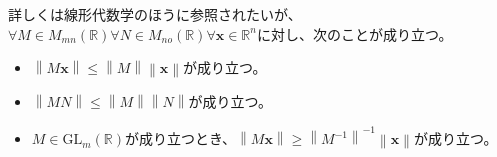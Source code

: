 \documentclass[dvipdfmx]{jsarticle}
\begin{document}
\begin{thm}\label{4.2.6.7}
詳しくは線形代数学のほうに参照されたいが、$\forall M \in M_{mn}\left( \mathbb{R} \right)\forall N \in M_{no}\left( \mathbb{R} \right)\forall\mathbf{x} \in \mathbb{R}^{n}$に対し、次のことが成り立つ。
\begin{itemize}
\item
  $\left\| M\mathbf{x} \right\| \leq \left\| M \right\|\left\| \mathbf{x} \right\|$が成り立つ。
\item
  $\left\| MN \right\| \leq \left\| M \right\|\left\| N \right\|$が成り立つ。
\item
  $M \in \mathrm{GL}_{m}\left( \mathbb{R} \right)$が成り立つとき、$\left\| M\mathbf{x} \right\| \geq \left\| M^{- 1} \right\|^{- 1}\left\| \mathbf{x} \right\|$が成り立つ。
\end{itemize}
\end{thm}
\end{document}
